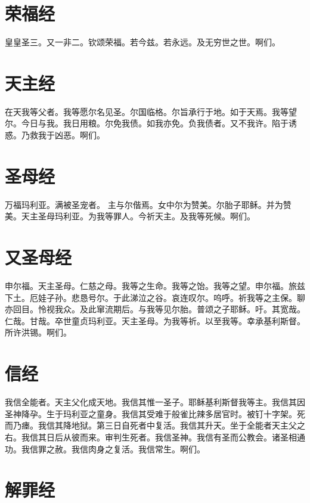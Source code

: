 \documentclass[UTF8,17pt]{ctexart}
\begin{document}
\section{荣福经}
\label{rong-fu-jing}

皇皇圣三。又一非二。钦颂荣福。若今兹。若永远。及无穷世之世。啊们。

\section{天主经}
\label{tian-zhu-jing}

在天我等父者。我等愿尔名见圣。尔国临格。尔旨承行于地。如于天焉。我等望尔。今日与我。我日用粮。尔免我债。如我亦免。负我债者。又不我许。陷于诱惑。乃救我于凶恶。啊们。

\section{圣母经}
\label{sheng-mu-jing}

万福玛利亚。满被圣宠者。 主与尔偕焉。女中尔为赞美。尔胎子耶稣。并为赞美。天主圣母玛利亚。为我等罪人。今祈天主。及我等死候。啊们。

\section{又圣母经}
\label{you-sheng-mu-jing}

申尔福。天主圣母。仁慈之母。我等之生命。我等之饴。我等之望。申尔福。旅兹下土。厄娃子孙。悲恳号尔。于此涕泣之谷。哀连叹尔。呜呼。祈我等之主保。聊亦回目。怜视我众。及此窜流期后。与我等见尔胎。普颂之子耶稣。吁。其宽哉。仁哉。甘哉。卒世童贞玛利亚。天主圣母。为我等祈。以至我等。幸承基利斯督。所许洪锡。啊们。

\section{信经}
\label{xin-jing}

我信全能者。天主父化成天地。我信其惟一圣子。耶稣基利斯督我等主。我信其因圣神降孕。生于玛利亚之童身。我信其受难于般雀比辣多居官时。被钉十字架。死而乃瘗。我信其降地狱。第三日自死者中复活。我信其升天。坐于全能者天主父之右。我信其日后从彼而来。审判生死者。我信圣神。我信有圣而公教会。诸圣相通功。我信罪之赦。我信肉身之复活。我信常生。啊们。

\section{解罪经}
\label{jie-zui-jing}
\end{document}
